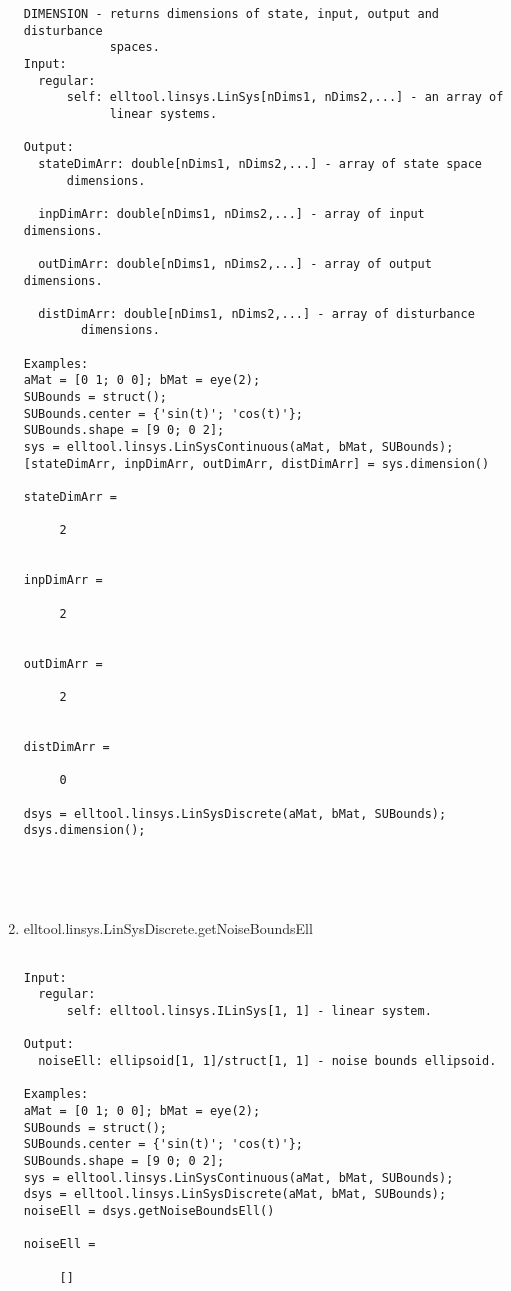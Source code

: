 \begin{enumerate}
\begin{lstlisting}
DIMENSION - returns dimensions of state, input, output and disturbance
            spaces.
Input:
  regular:
      self: elltool.linsys.LinSys[nDims1, nDims2,...] - an array of
            linear systems.

Output:
  stateDimArr: double[nDims1, nDims2,...] - array of state space
      dimensions.

  inpDimArr: double[nDims1, nDims2,...] - array of input dimensions.

  outDimArr: double[nDims1, nDims2,...] - array of output dimensions.

  distDimArr: double[nDims1, nDims2,...] - array of disturbance
        dimensions.

Examples:
aMat = [0 1; 0 0]; bMat = eye(2);
SUBounds = struct();
SUBounds.center = {'sin(t)'; 'cos(t)'};
SUBounds.shape = [9 0; 0 2];
sys = elltool.linsys.LinSysContinuous(aMat, bMat, SUBounds);
[stateDimArr, inpDimArr, outDimArr, distDimArr] = sys.dimension()

stateDimArr =

     2


inpDimArr =

     2


outDimArr =

     2


distDimArr =

     0

dsys = elltool.linsys.LinSysDiscrete(aMat, bMat, SUBounds);
dsys.dimension();





\end{lstlisting}
\fontfamily{\familydefault}
\selectfont
\item {elltool.linsys.LinSysDiscrete.getNoiseBoundsEll}
\selectfont
\begin{lstlisting}

Input:
  regular:
      self: elltool.linsys.ILinSys[1, 1] - linear system.

Output:
  noiseEll: ellipsoid[1, 1]/struct[1, 1] - noise bounds ellipsoid.

Examples:
aMat = [0 1; 0 0]; bMat = eye(2);
SUBounds = struct();
SUBounds.center = {'sin(t)'; 'cos(t)'};
SUBounds.shape = [9 0; 0 2];
sys = elltool.linsys.LinSysContinuous(aMat, bMat, SUBounds);
dsys = elltool.linsys.LinSysDiscrete(aMat, bMat, SUBounds);
noiseEll = dsys.getNoiseBoundsEll()

noiseEll =

     []






\end{lstlisting}
\end{enumerate}
